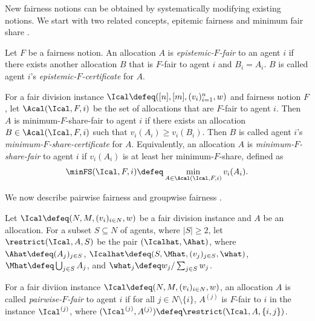 New fairness notions can be obtained by systematically modifying existing notions.
%
We start with two related concepts, epitemic fairness \cite{aziz2018knowledge,caragiannis2023new}
and minimum fair share \cite{caragiannis2023new}.

\begin{definition}
\label{defn:epistemic}
Let $F$ be a fairness notion.
An allocation $A$ is \emph{epistemic-$F$-fair} to an agent $i$ if
there exists another allocation $B$ that is $F$-fair to agent $i$ and $B_i = A_i$.
$B$ is called agent $i$'s \emph{epistemic-$F$-certificate} for $A$.
\end{definition}

\begin{definition}
\label{defn:minfs}
For a fair division instance $\Ical \defeq ([n], [m], (v_i)_{i=1}^n, w)$
and fairness notion $F$, let $\Acal(\Ical, F, i)$ be the set of allocations
that are $F$-fair to agent $i$.
%
Then $A$ is minimum-$F$-share-fair to agent $i$ if there exists
an allocation $B \in \Acal(\Ical, F, i)$ such that $v_i(A_i) \ge v_i(B_i)$.
Then $B$ is called agent $i$'s \emph{minimum-$F$-share-certificate} for $A$.
%
Equivalently, an allocation $A$ is \emph{minimum-$F$-share-fair} to agent $i$ if
$v_i(A_i)$ is at least her minimum-$F$-share, defined as
\[ \minFS(\Ical, F, i) \defeq \min_{A \in \Acal(\Ical, F, i)} v_i(A_i). \]
\end{definition}

We now describe pairwise fairness \cite{caragiannis2019unreasonable}
and groupwise fairness \cite{barman2018groupwise}.

\begin{definition}[restricting]
\label{defn:restricting}
Let $\Ical \defeq (N, M, (v_i)_{i \in N}, w)$ be a fair division instance
and $A$ be an allocation. For a subset $S \subseteq N$ of agents, where $|S| \ge 2$,
let $\restrict(\Ical, A, S)$ be the pair $(\Icalhat, \Ahat)$, where
$\Ahat \defeq (A_j)_{j \in S}$, $\Icalhat \defeq (S, \Mhat, (v_j)_{j \in S}, \what)$,
$\Mhat \defeq \bigcup_{j \in S} A_j$, and $\what_j \defeq w_j / \sum_{j \in S} w_j$.
\end{definition}

\begin{definition}
\label{defn:pairwise}
For a fair diviion instance $\Ical \defeq (N, M, (v_i)_{i \in N}, w)$,
an allocation $A$ is called \emph{pairwise-$F$-fair} to agent $i$ if
for all $j \in N \setminus \{i\}$, $A^{(j)}$ is $F$-fair to $i$ in the instance $\Ical^{(j)}$,
where $(\Ical^{(j)}, A^{(j)}) \defeq \restrict(\Ical, A, \{i, j\})$.
\end{definition}


